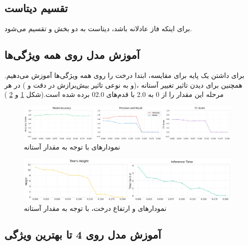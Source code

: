 \documentclass{article}
\begin{document}
	\subsection{تقسیم دیتاست}
	برای اینکه فاز 
	عادلانه باشد، دیتاست به دو بخش 
	و
	تقسیم می‌شود.\\
	\subsection{آموزش مدل روی همه ویژگی‌ها}
	برای داشتن یک پایه برای مقایسه، ابتدا درخت را روی همه ویژگی‌ها آموزش می‌دهیم. همچنین برای دیدن تاثیر تغییر آستانه
	،(و به نوعی تاثیر بیش‌برازش در دقت و 
	) در هر مرحله این مقدار را از 0 به 2.0 با قدم‌های 02.0 برده شده است.(شکل 
	\ref{fig: ig all train}
	و
	\ref{fig: ig all train2}
	)
	\begin{figure}[H]
		\centering
		\includegraphics[scale=0.3]{figs/all_feature_train1}
		\caption{
			نمودار‌های 
			با توجه به مقدار آستانه
		}
		\label{fig: ig all train}
	\end{figure}
	\begin{figure}[H]
		\centering
		\includegraphics[scale=0.3]{figs/all_feature_train2}
		\caption{
			نمودار‌های 
			و ارتفاع درخت،
			با توجه به مقدار آستانه
		}
		\label{fig: ig all train2}
	\end{figure}
	\subsection{آموزش مدل روی 4 تا بهترین ویژگی }
	
\end{document}
